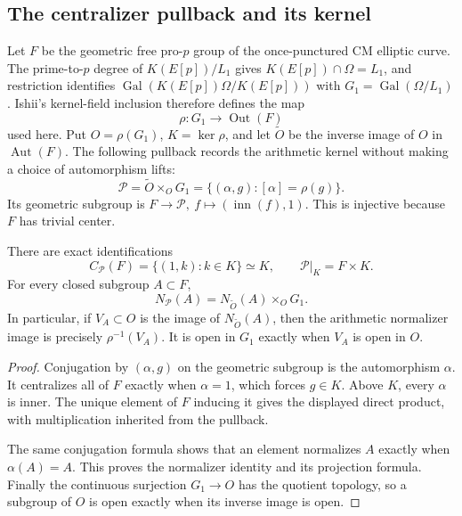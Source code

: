\subsection{The centralizer pullback and its kernel}
\label{subsec:cm-actual-centralizer}

Let \(F\) be the geometric free pro-\(p\) group of the
once-punctured CM elliptic curve. The prime-to-\(p\) degree
of \(K(E[p])/L_1\) gives
\(K(E[p])\cap\Omega=L_1\), and restriction identifies
\(\operatorname{Gal}(K(E[p])\Omega/K(E[p]))\) with
\(G_1=\operatorname{Gal}(\Omega/L_1)\).
Ishii's kernel-field inclusion therefore defines the map
\[
 \rho:G_1\longrightarrow\operatorname{Out}(F)
\]
used here.
Put \(O=\rho(G_1)\), \(K=\ker\rho\), and let
\(\widetilde O\) be the inverse image of \(O\) in
\(\operatorname{Aut}(F)\).  The following pullback records the
arithmetic kernel without making a choice of automorphism lifts:
\[
 \mathcal P=\widetilde O\times_O G_1
    =\{(\alpha,g):[\alpha]=\rho(g)\}.
\]
Its geometric subgroup is
\(F\longrightarrow\mathcal P,\ f\longmapsto(\operatorname{inn}(f),1)\).
This is injective because \(F\) has trivial center.

\begin{proposition}\label{prop:cm-actual-centralizer-pullback}
There are exact identifications
\[
 C_{\mathcal P}(F)=\{(1,k):k\in K\}\simeq K,
 \qquad
 \mathcal P|_K=F\times K.
\]
For every closed subgroup \(A\subset F\),
\[
 N_{\mathcal P}(A)=N_{\widetilde O}(A)\times_O G_1.
\]
In particular, if \(V_A\subset O\) is the image of
\(N_{\widetilde O}(A)\), then the arithmetic normalizer image
is precisely \(\rho^{-1}(V_A)\).  It is open in \(G_1\) exactly
when \(V_A\) is open in \(O\).
\end{proposition}

\begin{proof}
Conjugation by \((\alpha,g)\) on the geometric subgroup is
the automorphism \(\alpha\).  It centralizes all of \(F\)
exactly when \(\alpha=1\), which forces \(g\in K\).
Above \(K\), every \(\alpha\) is inner.  The unique element
of \(F\) inducing it gives the displayed direct product,
with multiplication inherited from the pullback.

The same conjugation formula shows that an element normalizes
\(A\) exactly when \(\alpha(A)=A\).  This proves the
normalizer identity and its projection formula.  Finally
the continuous surjection \(G_1\to O\) has the quotient
topology, so a subgroup of \(O\) is open exactly when
its inverse image is open.
\end{proof}

